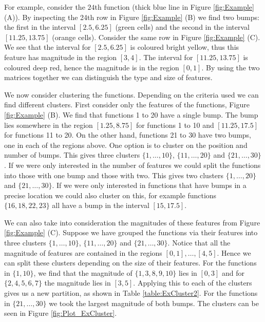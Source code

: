\documentclass[12pt]{book} %
\begin{document}
 For example, consider the $24$th function (thick blue line in Figure \ref{fig:Example} (A)). By inspecting the 24th row in Figure \ref{fig:Example} (B) we find two bumps: the first in the interval $[2.5,6.25]$ (green cells) and the second in the interval $[11.25,13.75]$ (orange cells). Consider the same row in Figure \ref{fig:Example} (C). We see that the interval for $[2.5,6.25]$ is coloured bright yellow, thus this feature has magnitude in the region $[3,4]$. The interval for $[11.25,13.75]$ is coloured deep red, hence the magnitude is in the region $[0,1]$. By using the two matrices together we can distinguish the type and size of features. 

We now consider clustering the functions. Depending on the criteria used we can find different clusters. First consider only the features of the functions, Figure \ref{fig:Example} (B). We find that functions 1 to 20 have a single bump.  The bump lies somewhere in the region $[1.25,8.75]$ for functions 1 to 10 and $[11.25,17.5]$ for functions 11 to 20. On the other hand, functions 21 to 30 have two bumps, one in each of the regions above. One option is to cluster on the position and number of bumps. This gives three clusters $\{1,\dots,10\}$, $\{11,\dots,20\}$ and $\{21,\dots,30\}$. If we were only interested in the number of features we could split the functions into those with one bump and those with two. This gives two clusters $\{1,\dots,20\}$ and $\{21,\dots,30\}$. If we were only interested in functions that have bumps in a precise location we could also cluster on this, for example functions $\{16,18,22,23\}$ all have a bump in the interval $[15,17.5]$.


We can also take into consideration the magnitudes of these features from Figure \ref{fig:Example} (C). Suppose we have grouped the functions via their features into three clusters $\{1,\dots,10\}$, $\{11,\dots,20\}$ and $\{21,\dots,30\}$. Notice that all the magnitude of features are contained in the regions $[0,1], \dots, [4,5]$. Hence we can split these clusters depending on the size of their features. For the functions in $\{1,10\}$, we find that the magnitude of $\{1,3,8,9,10\}$ lies in $[0,3]$ and for $\{2,4,5,6,7\}$ the magnitude lies in $[3,5]$. Applying this to each of the clusters gives us a new partition, as shown in Table \ref{table:ExCluster2}. For the functions in $\{21,\dots,30\}$ we took the largest magnitude of both bumps. The clusters can be seen in Figure \ref{fig:Plot_ExCluster}.
\end{document}
